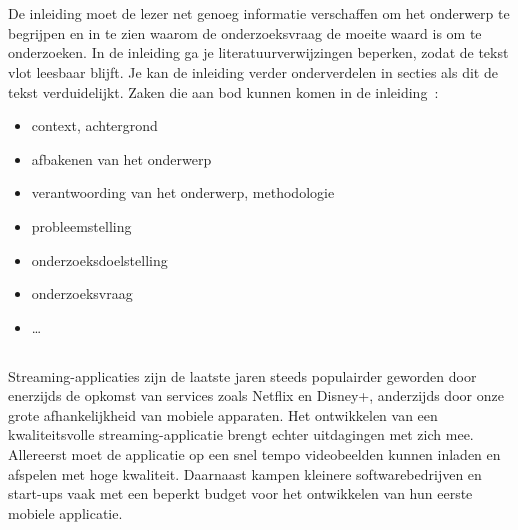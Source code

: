 
\chapter{}%
\label{ch:inleiding}

De inleiding moet de lezer net genoeg informatie verschaffen om het onderwerp te begrijpen en in te zien waarom de onderzoeksvraag de moeite waard is om te onderzoeken. In de inleiding ga je literatuurverwijzingen beperken, zodat de tekst vlot leesbaar blijft. Je kan de inleiding verder onderverdelen in secties als dit de tekst verduidelijkt. Zaken die aan bod kunnen komen in de inleiding~\autocite{Pollefliet2011}:

\begin{itemize}
  \item context, achtergrond
  \item afbakenen van het onderwerp
  \item verantwoording van het onderwerp, methodologie
  \item probleemstelling
  \item onderzoeksdoelstelling
  \item onderzoeksvraag
  \item \ldots
\end{itemize}

\section{}%
\label{sec:probleemstelling}


Streaming-applicaties zijn de laatste jaren steeds populairder geworden door enerzijds de opkomst van services zoals Netflix en Disney+, anderzijds door onze grote afhankelijkheid van mobiele apparaten. Het ontwikkelen van een kwaliteitsvolle streaming-applicatie brengt echter uitdagingen met zich mee. Allereerst moet de applicatie op een snel tempo videobeelden kunnen inladen en afspelen met hoge kwaliteit. Daarnaast kampen kleinere softwarebedrijven en start-ups vaak met een beperkt budget voor het ontwikkelen van hun eerste mobiele applicatie.

